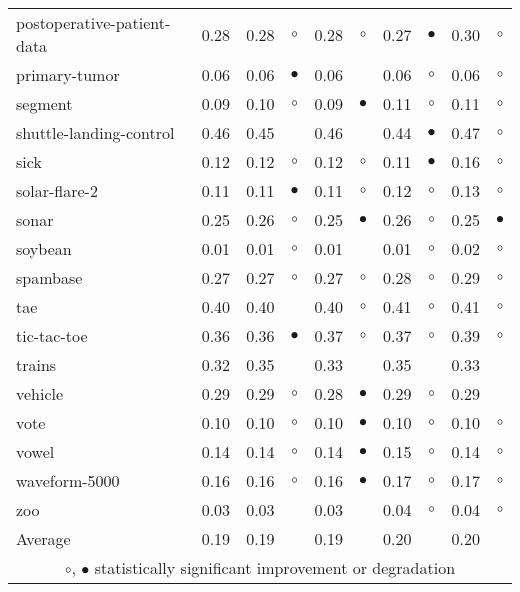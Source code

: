 \begin{table}[htb]
{\begin{tabular}{lrr@{\hspace{0.1cm}}cr@{\hspace{0.1cm}}cr@{\hspace{0.1cm}}cr@{\hspace{0.1cm}}c}
postoperative-patient-data & 0.28 & 0.28 &    $\circ$ & 0.28 &    $\circ$ & 0.27 & $\bullet$ & 0.30 &   $\circ$\\
primary-tumor & 0.06 & 0.06 &  $\bullet$ & 0.06 &            & 0.06 &   $\circ$ & 0.06 &   $\circ$\\
segment & 0.09 & 0.10 &    $\circ$ & 0.09 &  $\bullet$ & 0.11 &   $\circ$ & 0.11 &   $\circ$\\
shuttle-landing-control & 0.46 & 0.45 &            & 0.46 &            & 0.44 & $\bullet$ & 0.47 &   $\circ$\\
sick & 0.12 & 0.12 &    $\circ$ & 0.12 &    $\circ$ & 0.11 & $\bullet$ & 0.16 &   $\circ$\\
solar-flare-2 & 0.11 & 0.11 &  $\bullet$ & 0.11 &    $\circ$ & 0.12 &   $\circ$ & 0.13 &   $\circ$\\
sonar & 0.25 & 0.26 &    $\circ$ & 0.25 &  $\bullet$ & 0.26 &   $\circ$ & 0.25 & $\bullet$\\
soybean & 0.01 & 0.01 &    $\circ$ & 0.01 &            & 0.01 &   $\circ$ & 0.02 &   $\circ$\\
spambase & 0.27 & 0.27 &    $\circ$ & 0.27 &    $\circ$ & 0.28 &   $\circ$ & 0.29 &   $\circ$\\
tae & 0.40 & 0.40 &            & 0.40 &    $\circ$ & 0.41 &   $\circ$ & 0.41 &   $\circ$\\
tic-tac-toe & 0.36 & 0.36 &  $\bullet$ & 0.37 &    $\circ$ & 0.37 &   $\circ$ & 0.39 &   $\circ$\\
trains & 0.32 & 0.35 &            & 0.33 &            & 0.35 &           & 0.33 &          \\
vehicle & 0.29 & 0.29 &    $\circ$ & 0.28 &  $\bullet$ & 0.29 &   $\circ$ & 0.29 &          \\
vote & 0.10 & 0.10 &    $\circ$ & 0.10 &  $\bullet$ & 0.10 &   $\circ$ & 0.10 &   $\circ$\\
vowel & 0.14 & 0.14 &    $\circ$ & 0.14 &  $\bullet$ & 0.15 &   $\circ$ & 0.14 &   $\circ$\\
waveform-5000 & 0.16 & 0.16 &    $\circ$ & 0.16 &  $\bullet$ & 0.17 &   $\circ$ & 0.17 &   $\circ$\\
zoo & 0.03 & 0.03 &            & 0.03 &            & 0.04 &   $\circ$ & 0.04 &   $\circ$\\
\hline
Average & 0.19 & 0.19 &            & 0.19 &            & 0.20 &           & 0.20 &          \\
\hline
\multicolumn{10}{c}{$\circ$, $\bullet$ statistically significant improvement or degradation}\\
\end{tabular} \footnotesize \par}
\end{table}
